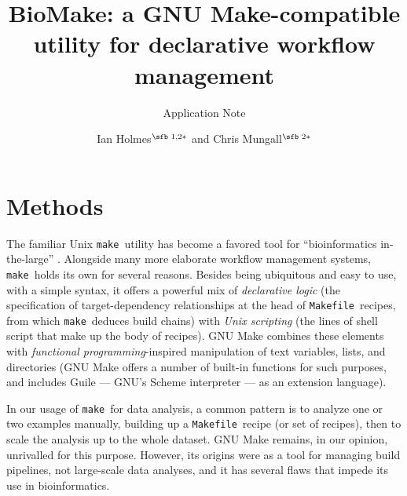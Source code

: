 \documentclass{bioinfo}
\newcommand\make{{\tt make}}
\newcommand\Makefile{{\tt Makefile}}
\begin{document}

\subtitle{Application Note}

\title[BioMake: declarative workflow management]{BioMake: a GNU Make-compatible utility for declarative workflow management}
\author[Ian Holmes and Chris Mungall]{Ian Holmes$^{\text{\sfb 1,2}*}$ and Chris Mungall$^{\text{\sfb 2}*}$}
\address{$^{\text{\sf 1}}$Department of Bioengineering, University of California, Berkeley, CA 94720, USA and \\
$^{\text{\sf 2}}$Lawrence Berkeley National Laboratory, 1 Cyclotron Rd, Berkeley, CA 94720, USA.}


\history{}

\editor{}


\maketitle

\section{Methods}

The familiar Unix \make\ utility has become a favored tool for ``bioinformatics in-the-large'' \citep{ParkerGorlickLee2003}.
Alongside many more elaborate workflow management systems, \make\ holds its own for several reasons.
Besides being ubiquitous and easy to use, with a simple syntax, it offers a powerful mix
of {\em declarative logic} (the specification of target-dependency relationships at the head of \Makefile\ recipes, from which \make\ deduces build chains)
with {\em Unix scripting} (the lines of shell script that make up the body of recipes).
GNU Make combines these elements with {\em functional programming}-inspired manipulation of text variables, lists, and directories
(GNU Make offers a number of built-in functions for such purposes, and includes Guile --- GNU's Scheme interpreter --- as an extension language).

In our usage of \make\ for data analysis, a common pattern is to analyze one or two examples manually, building up a \Makefile\ recipe (or set of recipes),
then to scale the analysis up to the whole dataset.
GNU Make remains, in our opinion, unrivalled for this purpose.
However, its origins were as a tool for managing build pipelines, not large-scale data analyses, and it has several flaws that impede its use in bioinformatics.
\end{document}

